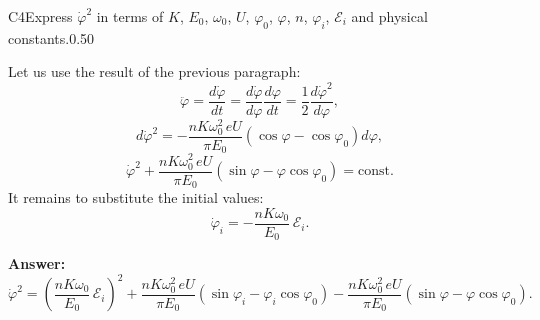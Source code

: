 \documentclass[11pt,a4paper]{article}
\begin{document}
\begin{solcard}{C4}{Express $\dot\varphi^2$ in terms of $K$, $E_0$, $\omega_0$, $U$, $\varphi_0$, $\varphi$, $n$, $\varphi_i$, $\mathcal E_i$ and physical constants.}{0.50}

Let us use the result of the previous paragraph: $$\ddot\varphi = \frac{d\dot\varphi}{dt} = \frac{d\dot\varphi}{d\varphi}\frac{d\varphi}{dt} = \frac{1}{2}\frac{d\dot\varphi^2}{d\varphi},$$ $$d\dot\varphi^2 = -\frac{nK\omega_0^2\,eU}{\pi E_0}\left(\cos\varphi - \cos\varphi_0\right)d\varphi,$$ $$\dot\varphi^2 + \frac{nK\omega_0^2\,eU}{\pi E_0}\left(\sin\varphi - \varphi\cos\varphi_0\right) = \text{const}.$$ It remains to substitute the initial values: $$\dot\varphi_i = -\frac{nK\omega_0}{E_0}\,\mathcal E_i.$$

\par\smallskip\noindent\textbf{Answer:} $$\dot\varphi^2 = \left(\frac{nK\omega_0}{E_0}\,\mathcal E_i\right)^2 + \frac{nK\omega_0^2\,eU}{\pi E_0}\left(\sin\varphi_i - \varphi_i\cos\varphi_0\right) - \frac{nK\omega_0^2\,eU}{\pi E_0}\left(\sin\varphi - \varphi\cos\varphi_0\right).$$
\end{solcard}
\end{document}
